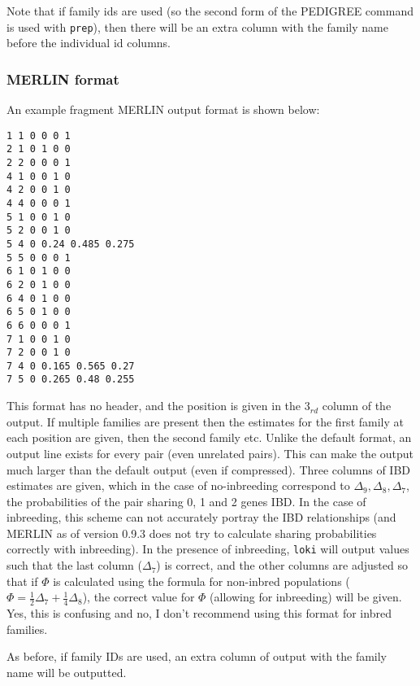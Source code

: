 \documentclass[10pt,a4paper]{article}
\newcommand{\Prep}{\texttt{prep}\xspace}
\newcommand{\Loki}{\texttt{loki}\xspace}
\begin{document}
Note that if family ids are used (so the second form
of the PEDIGREE command is used with \Prep), then there will be an extra
column with the family name before the individual id columns.  

\subsubsection{MERLIN format}
An example fragment MERLIN output format is shown below:
\begin{verbatim}
1 1 0 0 0 1
2 1 0 1 0 0
2 2 0 0 0 1
4 1 0 0 1 0
4 2 0 0 1 0
4 4 0 0 0 1
5 1 0 0 1 0
5 2 0 0 1 0
5 4 0 0.24 0.485 0.275
5 5 0 0 0 1
6 1 0 1 0 0
6 2 0 1 0 0
6 4 0 1 0 0
6 5 0 1 0 0
6 6 0 0 0 1
7 1 0 0 1 0
7 2 0 0 1 0
7 4 0 0.165 0.565 0.27
7 5 0 0.265 0.48 0.255
\end{verbatim}
This format has no header, and the position is given in the $3_{rd}$ column
of the output.  If multiple families are present then the estimates for the
first family at each position are given, then the second family etc.  Unlike
the default format, an output line exists for every pair (even unrelated
pairs).  This can make the output much larger than the default output (even
if compressed).  Three columns of IBD estimates are given, which in the case
of no-inbreeding correspond to $\Delta_9, \Delta_8, \Delta_7$, the
probabilities of the pair sharing 0, 1 and 2 genes IBD.  In the case of
inbreeding, this scheme can not accurately portray the IBD relationships
(and MERLIN as of version 0.9.3 does not try to calculate sharing
probabilities correctly with inbreeding).  In the presence of inbreeding,
\Loki will output values such that the last column ($\Delta_7$) is correct,
and the other columns are adjusted so that if $\Phi$ is calculated using the
formula for non-inbred populations
($\Phi=\frac{1}{2}\Delta_7+\frac{1}{4}\Delta_8$), the correct value for
$\Phi$ (allowing for inbreeding) will be given.  Yes, this is confusing and
no, I don't recommend using this format for inbred families.

As before, if family IDs are used, an extra column of output with the
family name will be outputted.
\end{document}
